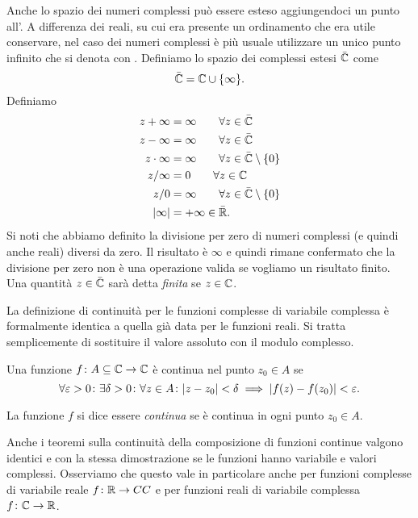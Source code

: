 Anche lo spazio dei numeri complessi può essere esteso aggiungendoci
un punto all'.
A differenza dei reali, su cui era presente un ordinamento che era utile conservare,
nel caso dei numeri complessi è più usuale utilizzare un unico punto infinito
che si denota con \myemph{$\infty$}.
Definiamo lo spazio dei complessi estesi $\bar {\mathbb C}$ come
\[
\bar {\mathbb C} = \mathbb C \cup \{\infty\}.
\]
Definiamo
\begin{align*}
  z + \infty &= \infty \qquad \forall z \in \bar{\mathbb C}\\
  z - \infty &= \infty \qquad \forall z \in \bar{\mathbb C}\\
   z\cdot \infty &= \infty \qquad \forall z \in \bar{\mathbb C}\setminus\{0\} \\
   z / \infty &= 0 \qquad \forall z \in \mathbb C \\
   z / 0 &= \infty \qquad \forall z \in \bar {\mathbb C} \setminus\{0\}\\
   {\left|\infty\right|} &= +\infty \in \bar {\mathbb R}.
\end{align*}
Si noti che abbiamo definito la divisione per zero di numeri complessi
(e quindi anche reali) diversi da zero. Il risultato è $\infty$ e quindi
rimane confermato che la divisione per zero non è una operazione valida
se vogliamo un risultato finito.
Una quantità $z\in \bar {\mathbb C}$ sarà detta \emph{finita} se $z\in \mathbb C$.

La definizione di continuità per le funzioni complesse di variabile complessa
è formalmente identica a quella già data per le funzioni reali.
Si tratta semplicemente di sostituire il valore assoluto con il modulo complesso.
%
\begin{definition}[continuità in $\CC$]
Una funzione $f\colon A \subseteq \mathbb C \to \mathbb C$ è
continua nel punto $z_0\in A$ se
\[
\forall \varepsilon>0\colon \exists \delta>0 \colon \forall z\in A\colon
{\left|z-z_0\right|}<\delta \implies {\left|f(z)-f(z_0)\right|} < \varepsilon.
\]

La funzione $f$ si dice essere \emph{continua} se
è continua in ogni punto $z_0\in A$.
\end{definition}

Anche i teoremi sulla continuità della composizione di funzioni
continue valgono identici e con la stessa dimostrazione
se le funzioni hanno variabile e valori complessi.
Osserviamo che questo vale
in particolare anche per funzioni complesse di variabile reale
$f\colon \mathbb R\to CC$ e per funzioni reali di variabile complessa
$f\colon \mathbb C \to \mathbb R$.

